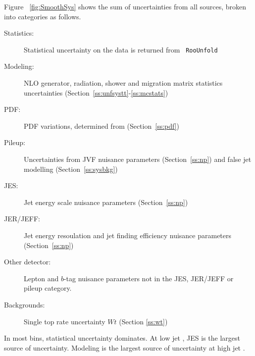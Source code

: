 Figure ~\ref{fig:SmoothSys} shows the sum of uncertainties from all sources, broken into categories as follows.
\begin{description}
\item[Statistics:] Statistical uncertainty on the data is returned from \texttt{ RooUnfold}
\item[Modeling:] NLO generator, radiation, shower and migration matrix statistics uncertainties (Section~\ref{ss:unfsystt}-\ref{ss:mcstats})
\item[PDF:] PDF variations, determined from \mcnlohw (Section~\ref{ss:pdf})
\item[Pileup:] Uncertainties from JVF nuisance parameters (Section~\ref{ss:np}) and false jet modelling (Section~\ref{ss:sysbkg})
\item[JES:] Jet energy scale nuisance parameters (Section~\ref{ss:np})
\item[JER/JEFF:] Jet energy resoulation and jet finding efficiency nuisance parameters (Section~\ref{ss:np})
\item[Other detector:] Lepton and $b$-tag nuisance parameters not in the JES, JER/JEFF or pileup category.
\item[Backgrounds:] Single top rate uncertainty $Wt$ (Section \ref{ss:wt}) 
\end{description}

In most bins, statistical uncertainty dominates. At low jet \pt, JES is the largest source of uncertainty. Modeling is the largest source of uncertainty at high jet \pt.




